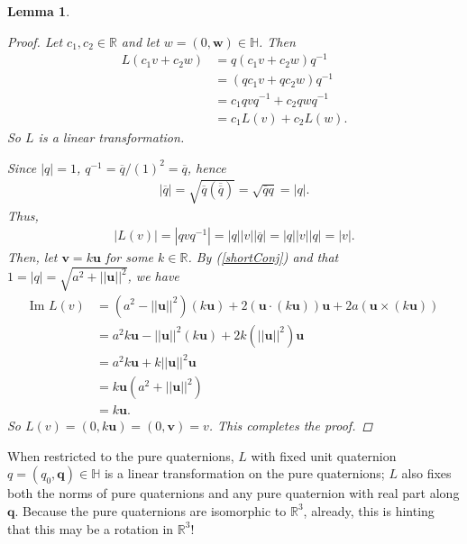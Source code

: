 \documentclass[12pt]{article}
\theoremstyle{plain}
\newtheorem{lem}[thm]{Lemma}
\theoremstyle{definition}
\begin{document}
\begin{lem}
\begin{proof}
Let $c_1,c_2\in\mathbb{R}$ and let $w=(0,\textbf{w})\in\mathbb{H}$. Then
\begin{align*}
    L(c_1v + c_2w) &= q(c_1v + c_2w)q^{-1} \\
        &= (qc_1v + qc_2w)q^{-1} \\
        &= c_1qvq^{-1} + c_2qwq^{-1} \\
        &= c_1L(v) + c_2L(w).
\end{align*}
So $L$ is a linear transformation. 

Since $|q|=1$, $q^{-1}=\overline{q}/(1)^2=\overline{q}$, hence
\begin{align*}
    |\overline{q}|=\sqrt{\overline{q}(\overline{\overline{q}})}=\sqrt{\overline{q}q}=|q|.
\end{align*}
Thus,
\begin{align*}
    |L(v)| = |qvq^{-1}| 
        = |q||v||\overline{q}|
        = |q||v||q| 
        = |v|.
\end{align*}
Then, let $\textbf{v}=k\textbf{u}$ for some $k\in\mathbb{R}$. By (\ref{shortConj}) and that $1 = |q| = \sqrt{a^2+||\textbf{u}||^2}$, we have
\begin{align*}
    \text{Im } L(v) &= (a^2 - ||\textbf{u}||^2)(k\textbf{u}) + 2(\textbf{u}\cdot (k\textbf{u}))\textbf{u} + 2a(\textbf{u}\times( k\textbf{u})) \\
        &= a^2k\textbf{u} - ||\textbf{u}||^2(k\textbf{u}) + 2k(||\textbf{u}||^2)\textbf{u} \\
        &= a^2k\textbf{u} + k||\textbf{u}||^2\textbf{u} \\
        &= k\textbf{u}(a^2+||\textbf{u}||^2) \\
        &= k\textbf{u}.
\end{align*}
So $L(v)=(0,k\textbf{u})=(0,\textbf{v})=v$. This completes the proof.
\end{proof}
\end{lem}
When restricted to the pure quaternions, $L$ with fixed unit quaternion $q=(q_0,\textbf{q})\in\mathbb{H}$ is a linear transformation on the pure quaternions; $L$ also fixes both the norms of pure quaternions and any pure quaternion with real part along $\textbf{q}$. Because the pure quaternions are isomorphic to $\mathbb{R}^3$, already, this is hinting that this may be a rotation in $\mathbb{R}^3$!
\end{document}
